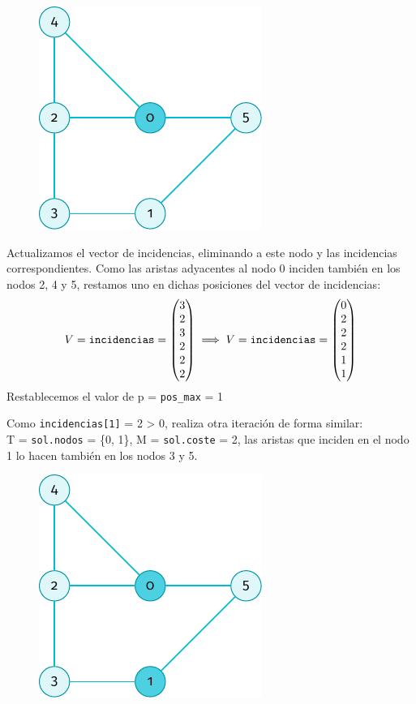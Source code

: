 \documentclass[11pt]{article}
\begin{document}
\begin{figure}[H]
	\centering \includegraphics{./img/grafo-ejemplo-1.pdf}
\end{figure}

Actualizamos el vector de incidencias, eliminando a este nodo y las incidencias correspondientes. Como las aristas adyacentes al nodo 0 inciden también en los nodos 2, 4 y 5, restamos uno en dichas posiciones del vector de incidencias: \\
$$ V = \verb|incidencias| = 
\begin{pmatrix}
	3 \\
	2 \\
	3 \\
	2 \\
	2 \\
	2 
\end{pmatrix} \implies V = \verb|incidencias| = 
\begin{pmatrix}
	0 \\
	2 \\
	2 \\
	2 \\
	1 \\
	1 
\end{pmatrix}$$
Restablecemos el valor de p = \verb|pos_max| = 1

Como \verb|incidencias[1]| = 2 > 0, realiza otra iteración de forma similar:\\
 
 T = \verb|sol.nodos| = \{0, 1\}, M = \verb|sol.coste| = 2, las aristas que inciden en el nodo 1 lo hacen también en los nodos 3 y 5.\\
 
\begin{figure}[H]
	\centering \includegraphics{./img/grafo-ejemplo-2.pdf}
\end{figure}
 
\end{document}
